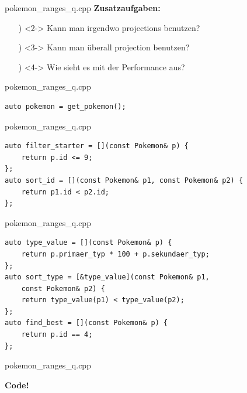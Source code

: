 \begin{frame}{pokemon\_ranges\_q.cpp}
    \textbf{Zusatzaufgaben:}\\
    \begin{enumerate} %
        \item[\✨)]<2-> Kann man irgendwo projections benutzen?
        \item[\✨)]<3-> Kann man überall projection benutzen?
        \item[\✨)]<4-> Wie sieht es mit der Performance aus?
    \end{enumerate}
\end{frame}

\begin{frame}[fragile]{pokemon\_ranges\_q.cpp}
    \begin{verbatim}
auto pokemon = get_pokemon();
    \end{verbatim}
\end{frame}

\begin{frame}[fragile]{pokemon\_ranges\_q.cpp}
    \begin{verbatim}
auto filter_starter = [](const Pokemon& p) {
    return p.id <= 9;
};
auto sort_id = [](const Pokemon& p1, const Pokemon& p2) {
    return p1.id < p2.id;
};
    \end{verbatim}
\end{frame}

\begin{frame}[fragile]{pokemon\_ranges\_q.cpp}
    \begin{verbatim}
auto type_value = [](const Pokemon& p) {
    return p.primaer_typ * 100 + p.sekundaer_typ;
};
auto sort_type = [&type_value](const Pokemon& p1,
    const Pokemon& p2) {
    return type_value(p1) < type_value(p2);
};
auto find_best = [](const Pokemon& p) {
    return p.id == 4;
};
    \end{verbatim}
\end{frame}

\begin{frame}{pokemon\_ranges\_q.cpp}
    \begin{center}
        \textbf{Code!}
    \end{center}
\end{frame}

